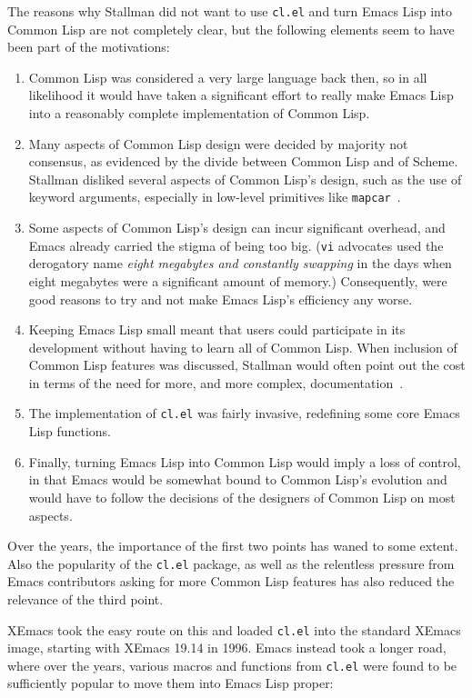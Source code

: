 \documentclass[format=acmsmall, review]{acmart}
\newcommand \Elisp {Emacs Lisp}
\begin{document}
The reasons why Stallman did not want to use \texttt{cl.el} and turn \Elisp{}
into Common Lisp are not completely clear, but the following elements seem
to have been part of the motivations:
\begin{enumerate}
\item Common Lisp was considered a very large language back then, so in all
  likelihood it would have taken a significant effort to really make
  \Elisp{} into a reasonably complete implementation of Common Lisp.
\item Many aspects of Common Lisp design were decided by majority not consensus, as
  evidenced by the divide between Common Lisp and of Scheme.
  Stallman disliked several aspects of Common Lisp's design, such as the use of
  keyword arguments, especially in low-level primitives like
  \texttt{mapcar}~\cite{RMS-keyword-args-are-clunky}.
\item Some aspects of Common Lisp's design can incur 
  significant overhead, and Emacs already carried the stigma of being
  too big.  (\texttt{vi} advocates used the derogatory name \emph{eight megabytes and
    constantly swapping} in the days when eight megabytes were a
  significant amount of memory.)  Consequently, were good reasons to try and not make
  \Elisp{}'s efficiency any worse.
\item Keeping \Elisp{} small meant that users could participate in its
  development without having to learn all of Common Lisp.  When inclusion of
  Common Lisp features was discussed, Stallman would often point out the cost
  in terms of the need for more, and more complex,
  documentation~\cite{RMS-cl-big-doc}.
\item The implementation of \texttt{cl.el} was fairly invasive, redefining
  some core \Elisp{} functions.
\item Finally, turning \Elisp{} into Common Lisp would imply a loss of control,
  in that Emacs would be somewhat bound to Common Lisp's evolution and would
  have to follow the decisions of the designers of Common Lisp on most aspects.
\end{enumerate}
Over the years, the importance of the first two points has waned to some
extent.  Also the popularity of the \texttt{cl.el} package, as well as the
relentless pressure from Emacs contributors asking for more Common Lisp
features has also reduced the relevance of the third point.

XEmacs took the easy route on this and loaded \texttt{cl.el} into the
standard XEmacs image, starting with XEmacs 19.14 in 1996.  Emacs instead
took a longer road, where over the years, various macros and functions from
\texttt{cl.el} were found to be sufficiently popular to move them into
\Elisp{} proper:
\end{document}
